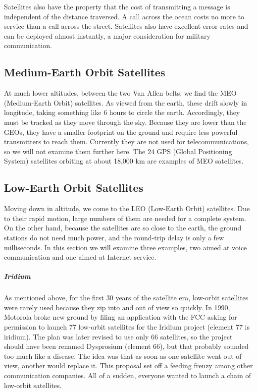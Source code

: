 \documentclass[b5paper,11pt]{memoir}
\begin{document}
Satellites also have the property that the cost of transmitting a
message is independent of the distance traversed. A call across the
ocean costs no more to service than a call across the street. Satellites
also have excellent error rates and can be deployed almost instantly, a
major consideration for military communication.

\protect\hypertarget{0130661023_ch02lev1sec4.htmlux5cux23ch02lev2sec14}{}{}

\subsection{Medium-Earth Orbit Satellites}

At much lower altitudes, between the two Van Allen belts, we find the
{MEO} ({Medium-Earth Orbit}) satellites. As viewed from the earth, these
drift slowly in longitude, taking something like 6 hours to circle the
earth. Accordingly, they must be tracked as they move through the sky.
Because they are lower than the GEOs, they have a smaller footprint on
the ground and require less powerful transmitters to reach them.
Currently they are not used for telecommunications, so we will not
examine them further here. The 24 {GPS} ({Global Positioning System})
satellites orbiting at about 18,000 km are examples of MEO satellites.

\protect\hypertarget{0130661023_ch02lev1sec4.htmlux5cux23ch02lev2sec15}{}{}

\subsection{Low-Earth Orbit Satellites}

Moving down in altitude, we come to the {LEO} ({Low-Earth Orbit})
satellites. Due to their rapid motion, large numbers of them are needed
for a complete system. On the other hand, because the satellites are so
close to the earth, the ground stations do not need much power, and the
round-trip delay is only a few milliseconds. In this section we will
examine three examples, two aimed at voice communication and one aimed
at Internet service.

\protect\hypertarget{0130661023_ch02lev1sec4.htmlux5cux23ch02lev3sec6}{}{}

\subparagraph{Iridium}

As mentioned above, for the first 30 years of the satellite era,
low-orbit satellites were rarely used because they zip into and out of
view so quickly. In 1990, Motorola broke new ground by filing an
application with the FCC asking for permission to launch 77 low-orbit
satellites for the Iridium project (element 77 is iridium). The plan was
later revised to use only 66 satellites, so the project should have been
renamed Dysprosium (element 66), but that probably sounded too much like
a disease. The idea was that as soon as one satellite went out of view,
another would replace it. This proposal set off a feeding frenzy among
other communication companies. All of a sudden, everyone wanted to
launch a chain of low-orbit satellites.
\end{document}
